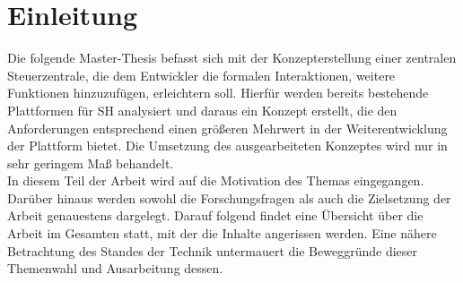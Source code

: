 \chapter{Einleitung}
\label{chap:Einleitung}
    Die folgende Master-Thesis befasst sich mit der Konzepterstellung einer zentralen Steuerzentrale, die 
    dem Entwickler die formalen Interaktionen, weitere Funktionen hinzuzufügen, erleichtern soll. Hierfür werden
    bereits bestehende Plattformen für \acl{SH} analysiert und daraus ein Konzept erstellt, die den Anforderungen 
    entsprechend einen größeren Mehrwert in der Weiterentwicklung der Plattform bietet. Die Umsetzung des ausgearbeiteten 
    Konzeptes wird nur in sehr geringem Maß behandelt.
    \\
    \linebreak
    In diesem Teil der Arbeit wird auf die Motivation des Themas eingegangen. Darüber hinaus 
    werden sowohl die Forschungsfragen als auch die Zielsetzung der Arbeit genauestens dargelegt. Darauf 
    folgend findet eine Übersicht über die Arbeit im Gesamten statt, mit der die Inhalte angerissen werden. 
    Eine nähere Betrachtung des Standes der Technik untermauert die Beweggründe dieser Themenwahl und 
    Ausarbeitung dessen. 


